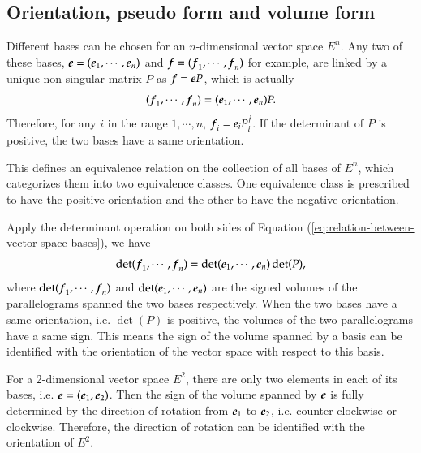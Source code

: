 \documentclass[11pt, a4paper]{book}
\begin{document}
\subsection{Orientation, pseudo form and volume form}

\begin{Definition}
  \label{defi:vector-space-orientation}
  Different bases can be chosen for an $n$-dimensional vector space $E^n$. Any two of
  these bases, $\boldsymbol{e} = (\boldsymbol{e}_1,\cdots,\boldsymbol{e}_n)$ and
  $\boldsymbol{f} = (\boldsymbol{f}_1,\cdots,\boldsymbol{f}_n)$ for example, are linked by a unique
  non-singular matrix $P$ as $\boldsymbol{f} = \boldsymbol{e} P$, which is actually
  \begin{equation}
    \label{eq:relation-between-vector-space-bases}
    (\boldsymbol{f}_1,\cdots,\boldsymbol{f}_n) = (\boldsymbol{e}_1,\cdots,\boldsymbol{e}_n) P.
  \end{equation}
  Therefore, for any $i$ in the range $1,\cdots,n$, $\boldsymbol{f}_i = \boldsymbol{e}_i P^j_i$. If
  the determinant of $P$ is positive, the two bases have a same orientation.

  This defines an equivalence relation on the collection of all bases of $E^n$, which
  categorizes them into two equivalence classes. One equivalence class is prescribed to
  have the positive orientation and the other to have the negative orientation.
\end{Definition}

Apply the determinant operation on both sides of Equation
(\ref{eq:relation-between-vector-space-bases}), we have
\begin{equation*}
  \det(\boldsymbol{f}_1,\cdots,\boldsymbol{f}_n) = \det(\boldsymbol{e}_1,\cdots,\boldsymbol{e}_n) \det(P),
\end{equation*}
where $\det(\boldsymbol{f}_1,\cdots,\boldsymbol{f}_n)$ and $\det(\boldsymbol{e}_1,\cdots,\boldsymbol{e}_n)$ are
the signed volumes of the parallelograms spanned the two bases respectively. When the two
bases have a same orientation, i.e. $\det(P)$ is positive, the volumes of the two
parallelograms have a same sign. This means the sign of the volume spanned by a basis can
be identified with the orientation of the vector space with respect to this basis.

\begin{Example}
  For a 2-dimensional vector space $E^2$, there are only two elements in each of its
  bases, i.e. $\boldsymbol{e} =(\boldsymbol{e}_1,\boldsymbol{e}_2)$. Then the sign of the volume spanned by
  $\boldsymbol{e}$ is fully determined by the direction of rotation from $\boldsymbol{e}_1$ to
  $\boldsymbol{e}_2$, i.e. counter-clockwise or clockwise. Therefore, the direction of rotation
  can be identified with the orientation of $E^2$.
\end{Example}
\end{document}
